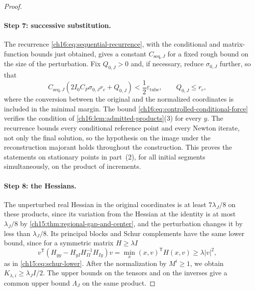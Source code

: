 \begin{proof}
\paragraph{Step 7: successive substitution.}
The recurrence \eqref{ch16:eq:sequential-recurrence}, with the conditional and matrix-function bounds just obtained, gives a constant $C_{\mathrm{seq},J}$ for a fixed rough bound on the size of the perturbation. Fix $Q_{0,J}>0$ and, if necessary, reduce $\sigma_{0,J}$ further, so that
\[
 C_{\mathrm{seq},J}(2I_0C_P\sigma_{0,J}r_c+Q_{0,J})
       <\frac12\varepsilon_{\mathrm{tube}},
 \qquad Q_{0,J}\le r_c,
\]
where the conversion between the original and the normalized coordinates is included in the minimal margin. The bound \eqref{ch16:eq:controlled-conditional-force} verifies the condition of \cref{ch16:lem:admitted-products}(3) for every $y$. The recurrence bounds every conditional reference point and every Newton iterate, not only the final solution, so the hypothesis on the image under the reconstruction majorant holds throughout the construction. This proves the statements on stationary points in part~(2), for all initial segments simultaneously, on the product of increments.

\paragraph{Step 8: the Hessians.}
The unperturbed real Hessian in the original coordinates is at least $7\lambda_J/8$ on these products, since its variation from the Hessian at the identity is at most $\lambda_J/8$ by \cref{ch15:thm:regional-gap-and-center}, and the perturbation changes it by less than $\lambda_J/8$. Its principal blocks and Schur complements have the same lower bound, since for a symmetric matrix $H\ge\lambda I$
\[
 v^{\mathsf T}(H_{yy}-H_{yI}H_{II}^{-1}H_{Iy})v
          =\min_x(x,v)^{\mathsf T}H(x,v)\ge\lambda|v|^2,
\]
as in \eqref{ch15:eq:schur-lower}. After the normalization by $M^i\ge1$, we obtain $K_{\lambda,i}\ge\lambda_JI/2$. The upper bounds on the tensors and on the inverses give a common upper bound $\Lambda_J$ on the same product.


\end{proof}
